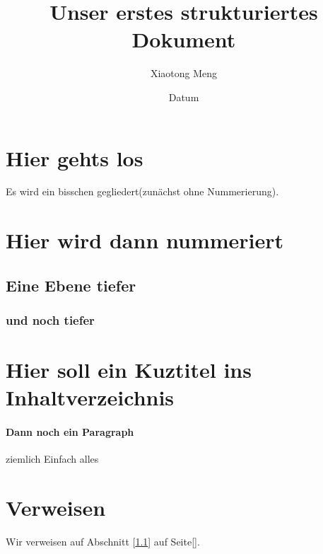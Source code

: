 \documentclass{scrartcl}
\begin{document}
\title{Unser erstes strukturiertes Dokument}
\author{Xiaotong Meng}
\date{Datum}
\maketitle




\tableofcontents

\section*{Hier gehts los}
Es wird ein bisschen gegliedert(zunächst ohne Nummerierung).

\section{Hier wird dann nummeriert}
\subsection{Eine Ebene tiefer} \label{first label}



\subsubsection{und noch tiefer}

\section[kurztitel] {Hier soll ein Kuztitel ins Inhaltverzeichnis} 

\paragraph*{Dann noch ein Paragraph}
ziemlich Einfach alles

\section{Verweisen}


Wir verweisen auf Abschnitt [\ref{first label}] auf Seite[\pageref{first label}].
\end{document}
